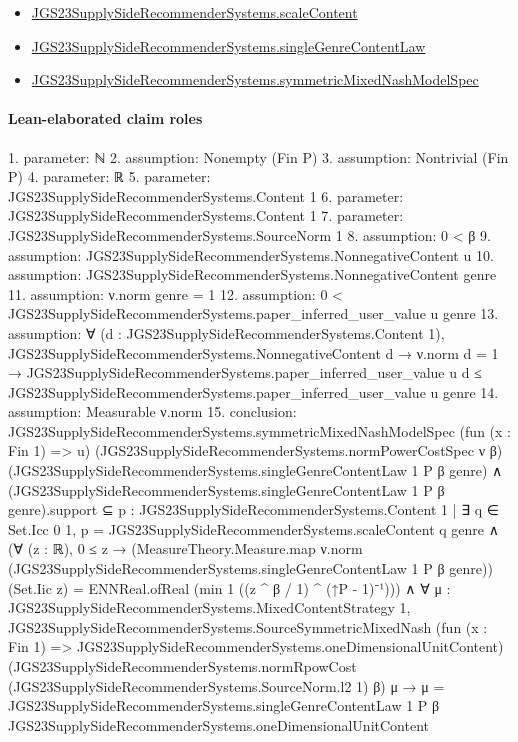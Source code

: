 \documentclass[10pt]{article}
\begin{document}
\begin{itemize}
\item \hyperlink{governing-declaration-c0824fcccb145634}{JGS23\allowbreak{}Supply\allowbreak{}Side\allowbreak{}Recommender\allowbreak{}Systems.\allowbreak{}scale\allowbreak{}Content}
\item \hyperlink{governing-declaration-205216ea3d333b14}{JGS23\allowbreak{}Supply\allowbreak{}Side\allowbreak{}Recommender\allowbreak{}Systems.\allowbreak{}single\allowbreak{}Genre\allowbreak{}Content\allowbreak{}Law}
\item \hyperlink{paper-prerequisite-b412efba7deb757f}{JGS23\allowbreak{}Supply\allowbreak{}Side\allowbreak{}Recommender\allowbreak{}Systems.\allowbreak{}symmetric\allowbreak{}Mixed\allowbreak{}Nash\allowbreak{}Model\allowbreak{}Spec}
\end{itemize}
\paragraph{Lean-elaborated claim roles}\begin{ReviewVerbatim}
1. parameter: ℕ
2. assumption: Nonempty (Fin P)
3. assumption: Nontrivial (Fin P)
4. parameter: ℝ
5. parameter: JGS23SupplySideRecommenderSystems.Content 1
6. parameter: JGS23SupplySideRecommenderSystems.Content 1
7. parameter: JGS23SupplySideRecommenderSystems.SourceNorm 1
8. assumption: 0 < β
9. assumption: JGS23SupplySideRecommenderSystems.NonnegativeContent u
10. assumption: JGS23SupplySideRecommenderSystems.NonnegativeContent genre
11. assumption: ν.norm genre = 1
12. assumption: 0 < JGS23SupplySideRecommenderSystems.paper_inferred_user_value u genre
13. assumption: ∀ (d : JGS23SupplySideRecommenderSystems.Content 1),
  JGS23SupplySideRecommenderSystems.NonnegativeContent d →
    ν.norm d = 1 →
      JGS23SupplySideRecommenderSystems.paper_inferred_user_value u d ≤
        JGS23SupplySideRecommenderSystems.paper_inferred_user_value u genre
14. assumption: Measurable ν.norm
15. conclusion: JGS23SupplySideRecommenderSystems.symmetricMixedNashModelSpec (fun (x : Fin 1) => u)
    (JGS23SupplySideRecommenderSystems.normPowerCostSpec ν β)
    (JGS23SupplySideRecommenderSystems.singleGenreContentLaw 1 P β genre) ∧
  (JGS23SupplySideRecommenderSystems.singleGenreContentLaw 1 P β genre).support ⊆
      {p : JGS23SupplySideRecommenderSystems.Content 1 |
        ∃ q ∈ Set.Icc 0 1, p = JGS23SupplySideRecommenderSystems.scaleContent q genre} ∧
    (∀ (z : ℝ),
        0 ≤ z →
          (MeasureTheory.Measure.map ν.norm (JGS23SupplySideRecommenderSystems.singleGenreContentLaw 1 P β genre))
              (Set.Iic z) =
            ENNReal.ofReal (min 1 ((z ^ β / 1) ^ (↑P - 1)⁻¹))) ∧
      ∀ {μ : JGS23SupplySideRecommenderSystems.MixedContentStrategy 1},
        JGS23SupplySideRecommenderSystems.SourceSymmetricMixedNash
            (fun (x : Fin 1) => JGS23SupplySideRecommenderSystems.oneDimensionalUnitContent)
            (JGS23SupplySideRecommenderSystems.normRpowCost (JGS23SupplySideRecommenderSystems.SourceNorm.l2 1) β) μ →
          μ =
            JGS23SupplySideRecommenderSystems.singleGenreContentLaw 1 P β
              JGS23SupplySideRecommenderSystems.oneDimensionalUnitContent
\end{ReviewVerbatim}
\end{document}
